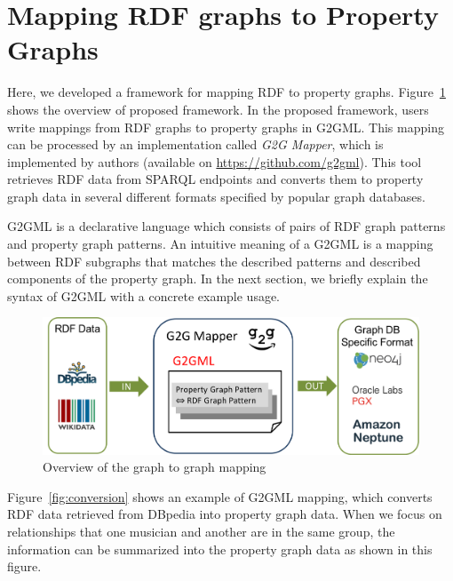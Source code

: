 \documentclass[runningheads]{llncs}
\begin{document}
\section{Mapping RDF graphs to Property Graphs}

Here, we developed a framework for mapping RDF to property graphs.
Figure~\ref{fig:dataflow} shows the overview of proposed framework.
In the proposed framework, users write mappings from RDF graphs to property graphs in G2GML.
This mapping can be processed by an implementation called \textit{G2G Mapper}, which is implemented by authors (available on \url{https://github.com/g2gml}). This tool retrieves RDF data from SPARQL endpoints and converts them to property graph data in several different formats specified by popular graph databases.

G2GML is a declarative language which consists of pairs of RDF graph patterns and property graph patterns. 
An intuitive meaning of a G2GML is a mapping between RDF subgraphs that matches the described patterns and described components of the property graph. In the next section, we briefly explain the syntax of G2GML with a concrete example usage.

\begin{figure}
\center
\includegraphics[width=1.0\textwidth]{dataflow.png}
\caption{Overview of the graph to graph mapping}
\label{fig:dataflow}
\end{figure}


Figure~\ref{fig:conversion} shows an example of G2GML mapping, which converts RDF data retrieved from DBpedia into property graph data. When we focus on relationships that one musician and another are in the same group, the information can be summarized into the property graph data as shown in this figure.
\end{document}
